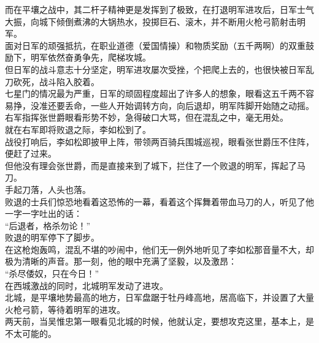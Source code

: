 \begin{multicols}{\theparacolNo}
而在平壤之战中，其二杆子精神更是发挥到了极致，在打退明军进攻后，日军士气大振，向城下倾倒煮沸的大锅热水，投掷巨石、滚木，并不断用火枪弓箭射击明军。\\

面对日军的顽强抵抗，在职业道德（爱国情操）和物质奖励（五千两啊）的双重鼓励下，明军依然奋勇争先，爬梯攻城。\\

但日军的战斗意志十分坚定，明军进攻屡次受挫，个把爬上去的，也很快被日军乱刀砍死，战斗陷入胶着。\\

七星门的情况最为严重，日军的顽固程度超出了许多人的想象，眼看这五千两不容易挣，没准还要丢命，一些人开始调转方向，向后退却，明军阵脚开始随之动摇。右军指挥张世爵眼看形势不妙，急得破口大骂，但在混乱之中，毫无用处。\\

就在右军即将败退之际，李如松到了。\\

战役打响后，李如松即披甲上阵，带领两百骑兵围城巡视，眼看张世爵压不住阵，便赶了过来。\\

但他没有理会张世爵，而是直接来到了城下，拦住了一个败退的明军，挥起了马刀。\\

手起刀落，人头也落。\\

败退的士兵们惊恐地看着这恐怖的一幕，看着这个挥舞着带血马刀的人，听见了他一字一字吐出的话：\\

“后退者，格杀勿论！”\\

败退的明军停下了脚步。\\

在这枪炮轰鸣，混乱不堪的吵闹中，他们无一例外地听见了李如松那音量不大，却极为清晰的声音。那一刻，他的眼中充满了坚毅，以及激昂：\\

“杀尽倭奴，只在今日！”\\

在西城激战的同时，北城明军发动了进攻。\\

北城，是平壤地势最高的地方，日军盘踞于牡丹峰高地，居高临下，并设置了大量火枪弓箭，等待着明军的进攻。\\

两天前，当吴惟忠第一眼看见北城的时候，他就认定，要想攻克这里，基本上，是不太可能的。\\


\end{multicols}
